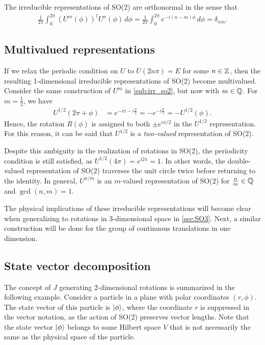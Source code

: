     The irreducible representations of SO(2) are orthonormal in the sense that
    \begin{align*}
        \frac{1}{2\pi}\int_{0}^{2\pi}{(U^m(\phi))}^\dagger U^n(\phi) \,d\phi = \frac{1}{2\pi}\int_{0}^{2\pi} e^{-i(n-m)\phi} \,d\phi = \delta_{nm}.
    \end{align*}

    \subsection{Multivalued representations}
    If we relax the periodic condition on $U$ to $U(2n\pi) = E$ for some $n\in\mathbb{Z}$, then the resulting 1-dimensional irreducible representations of SO(2) become multivalued. Consider the same construction of $U^m$ in \cref{sub:irr_so2}, but now with $m\in\mathbb{Q}$. For $m=\frac{1}{2}$, we have
    \begin{align*}
        U^{1/2}(2\pi + \phi) &= e^{-i\pi -i\frac{\phi}{2}} = -e^{-i\frac{\phi}{2}} = -U^{1/2}(\phi).
    \end{align*}
    Hence, the rotation $R(\phi)$ is assigned to both $\pm e^{i\phi/2}$ in the $U^{1/2}$ representation. For this reason, it can be said that $U^{1/2}$ is a \textit{two-valued} representation of SO(2).
    
    Despite this ambiguity in the realization of rotations in SO(2), the periodicity condition is still satisfied, as $U^{1/2}(4\pi) = e^{i2\pi} = 1$. In other words, the double-valued representation of SO(2) traverses the unit circle twice before returning to the identity. In general, $U^{n/m}$ is an $m$-valued representation of SO(2) for $\frac{n}{m}\in\mathbb{Q}$ and $\gcd(n,m)=1$.
    
    The physical implications of these irreducible representations will become clear when generalizing to rotations in 3-dimensional space in \cref{sec:SO3}. Next, a similar construction will be done for the group of continuous translations in one dimension.

    \subsection{State vector decomposition}\label{sub:SO2_decomp}
    The concept of $J$ generating 2-dimensional rotations is summarized in the following example. Consider a particle in a plane with polar coordinates $(r,\phi)$. The state vector of this particle is $\ket{\phi}$, where the coordinate $r$ is suppressed in the vector notation, as the action of SO(2) preserves vector lengths. Note that the state vector $\ket{\phi}$ belongs to some Hilbert space $V$ that is not necessarily the same as the physical space of the particle.
    
